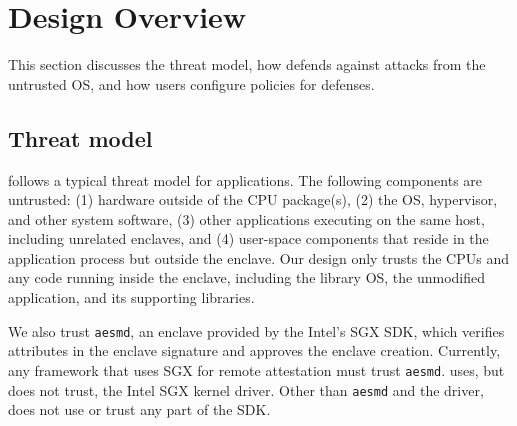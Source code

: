 \section{\graphenesgx{} Design Overview}
\label{sec:threat}

This section discusses the threat model,
how \graphenesgx{} defends against attacks from the untrusted OS,
and how users configure policies for defenses.


\subsection{Threat model}


\graphenesgx{} follows a typical threat model for \sgx{} applications.
The following components are untrusted:
(1) hardware outside of the \intel{} CPU package(s),
(2) the OS, hypervisor, and other system software,
(3) other applications executing on the same host, including unrelated enclaves,
and (4) user-space components that
reside in the application process but outside the enclave.
Our design only trusts the CPUs and any code running inside the enclave, including the library OS, the unmodified application, and its supporting libraries. 

We also trust {\tt aesmd}, an enclave provided by the Intel's SGX SDK, which verifies
attributes in the enclave signature and approves the enclave creation.
Currently, any framework that uses SGX for remote attestation must trust {\tt aesmd}.
\graphenesgx{} uses, but does not trust, the Intel SGX kernel driver.
Other than {\tt aesmd} and the driver, \graphenesgx{} does not use or trust any part of the SDK.


